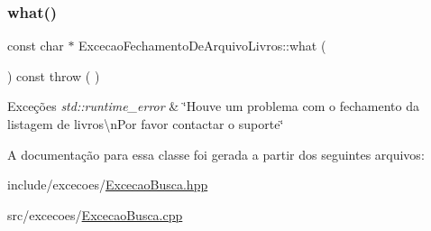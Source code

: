 \subsubsection{\texorpdfstring{what()}{what()}}
{\footnotesize\ttfamily const char $\ast$ Excecao\+Fechamento\+De\+Arquivo\+Livros\+::what (\begin{DoxyParamCaption}{ }\end{DoxyParamCaption}) const throw ( ) \hspace{0.3cm}{\ttfamily [virtual]}}


\begin{DoxyExceptions}{Exceções}
{\em std\+::runtime\+\_\+error} & \char`\"{}\+Houve um problema com o fechamento da listagem de livros\textbackslash{}n\+Por favor contactar o suporte\char`\"{} \\
\hline
\end{DoxyExceptions}


A documentação para essa classe foi gerada a partir dos seguintes arquivos\+:\begin{DoxyCompactItemize}
\item 
include/excecoes/\mbox{\hyperlink{_excecao_busca_8hpp}{Excecao\+Busca.\+hpp}}\item 
src/excecoes/\mbox{\hyperlink{_excecao_busca_8cpp}{Excecao\+Busca.\+cpp}}\end{DoxyCompactItemize}
